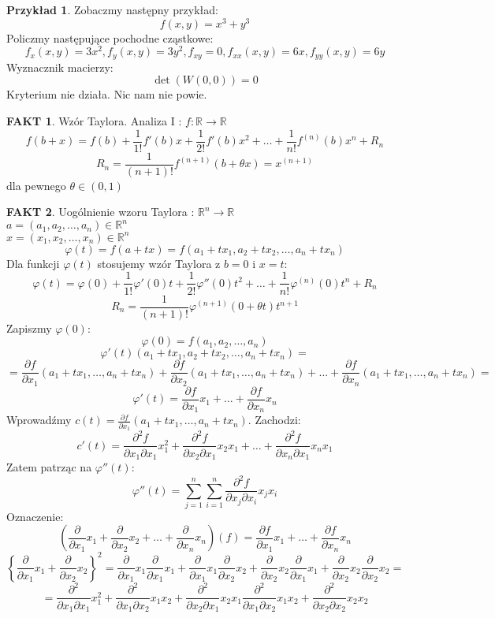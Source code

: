 \documentclass{article}
\theoremstyle{definition}
\theoremstyle{definition}
\theoremstyle{definition}
\newtheorem{pk}{Przykład}[subsection]
\theoremstyle{definition}
\newtheorem*{fakt}{FAKT}
\begin{document}
\begin{pk}
    Zobaczmy następny przykład:
    \[ f(x,y) = x^3 + y^3\]
    Policzmy następujące pochodne cząstkowe:
    \[ f_x(x,y)=3x^2, f_y(x,y)=3y^2, f_{xy}=0, f_{xx}(x,y) = 6x ,f_{yy}(x,y) = 6y\]
    Wyznacznik macierzy:
    \[ \det(W(0,0)) = 0\]
    Kryterium nie działa. Nic nam nie powie.
\end{pk}

\begin{fakt}
Wzór Taylora. Analiza I : $f:\mathbb{R} \rightarrow \mathbb{R}$
\[f(b+x) = f(b) + \frac{1}{1!} f'(b)x + \frac{1}{2!} f'(b) x^2 + \dots + \frac{1}{n!} f^{(n)}(b) x^n + R_n\]
\[R_n = \frac{1}{(n+1)!} f^{(n+1)} (b+\theta x) = x^{(n+1)} \]
dla pewnego $\theta\in(0,1)$\\
\end{fakt}

\begin{fakt}
Uogólnienie wzoru Taylora : $\mathbb{R}^n \rightarrow \mathbb{R}$\\
$a=(a_1,a_2,\dots,a_n)\in\mathbb{R}^n$\\ $x=(x_1,x_2,\dots, x_n)\in\mathbb{R}^n$
\[\varphi(t) = f(a+tx) = f(a_1+tx_1,a_2+tx_2,\dots,a_n+tx_n)\]
Dla funkcji $\varphi(t)$ stosujemy wzór Taylora z $b=0$ i $x=t$:
\[\varphi(t) = \varphi(0) + \frac{1}{1!} \varphi'(0)t + \frac{1}{2!} \varphi''(0)t^2 + \dots + \frac{1}{n!} \varphi^{(n)}(0) t^{n} + R_n\]
\[R_n = \frac{1}{(n+1)!} \varphi^{(n+1)} (0+\theta t) t^{n+1}\]
Zapiszmy $\varphi(0)$:
\[\varphi(0) = f(a_1,a_2,\dots, a_n)\]
\[\varphi'(t)(a_1+tx_1,a_2+tx_2,\dots,a_n+tx_n)=\]
\[=\frac{\partial f}{\partial x_1}(a_1+tx_1,\dots,a_n+tx_n) + \frac{\partial f}{\partial x_2}(a_1+tx_1,\dots,a_n+tx_n) + \dots + \frac{\partial f}{\partial x_n}(a_1+tx_1,\dots,a_n+tx_n)=\]
\[\varphi'(t) = \frac{\partial f}{\partial x_1} x_1 + \dots + \frac{\partial f}{\partial x_n} x_n\]
Wprowadźmy $c(t)=\frac{\partial f}{\partial x_1}(a_1+tx_1,\dots,a_n+tx_n)$. Zachodzi:
\[c'(t) = \frac{\partial^2 f}{\partial x_1 \partial x_1} x_1^2 + \frac{\partial^2 f}{\partial x_2 \partial x_1} x_2 x_1 + \dots + \frac{\partial^2 f}{\partial x_n \partial x_1} x_n x_1\]
Zatem patrząc na $\varphi''(t)$:
\[\varphi''(t)=\sum_{j=1}^{n}\sum_{i=1}^{n} \frac{\partial^2 f}{\partial x_j \partial x_i} x_j x_i\]
Oznaczenie:
\[\left(\frac{\partial}{\partial x_1} x_1 + \frac{\partial}{\partial x_2} x_2 + \dots + \frac{\partial}{\partial x_n} x_n\right) \left(f\right) = \frac{\partial f}{\partial x_1} x_1 + \dots + \frac{\partial f}{\partial x_n} x_n \]
\[\left\{\frac{\partial}{\partial x_1} x_1 + \frac{\partial}{\partial x_2} x_2\right\}^2 = \frac{\partial}{\partial x_1} x_1 \frac{\partial}{\partial x_1} x_1 + \frac{\partial}{\partial x_1} x_1 \frac{\partial}{\partial x_2} x_2 + \frac{\partial}{\partial x_2} x_2  \frac{\partial}{\partial x_1} x_1 + \frac{\partial}{\partial x_2} x_2 \frac{\partial}{\partial x_2} x_2=\]
\[=\frac{\partial^2}{\partial x_1 \partial x_1} x_1^2 + \frac{\partial^2}{\partial x_1 \partial x_2} x_1 x_2 + \frac{\partial^2}{\partial x_2 \partial x_1} x_2 x_1\frac{\partial^2}{\partial x_1 \partial x_2} x_1 x_2 + \frac{\partial^2}{\partial x_2 \partial x_2} x_2 x_2\]
\end{fakt}
\end{document}
